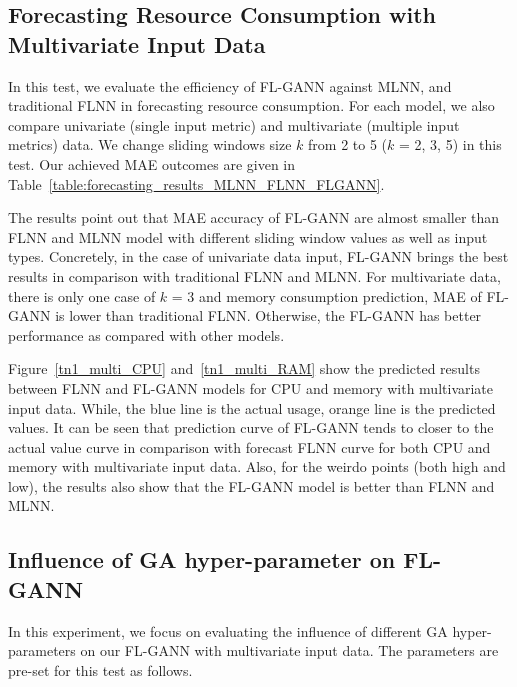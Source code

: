 \documentclass[conference]{IEEEtran}
\begin{document}
\subsection{Forecasting Resource Consumption with Multivariate Input Data}
\label{forecast}

In this test, we evaluate the efficiency of FL-GANN against MLNN, and traditional FLNN in forecasting resource consumption. For each model, we also compare univariate (single input metric) and multivariate (multiple input metrics) data. We change sliding windows size $k$ from 2 to 5 ($k$ = 2, 3, 5) in this test. Our achieved MAE outcomes are given in Table~\ref{table:forecasting_results_MLNN_FLNN_FLGANN}.

The results point out that MAE accuracy of FL-GANN are almost smaller than FLNN and MLNN model with different sliding window values as well as input types. Concretely, in the case of univariate data input, FL-GANN brings the best results in comparison with traditional FLNN and MLNN. For multivariate data, there is only one case of $k$ = 3 and memory consumption prediction, MAE of FL-GANN is lower than traditional FLNN. Otherwise, the FL-GANN has better performance as compared with other models.

Figure~\ref{tn1_multi_CPU} and~\ref{tn1_multi_RAM} show the predicted results between FLNN and FL-GANN models for CPU and memory with multivariate input data. While, the blue line is the actual usage, orange line is the predicted values. It can be seen that prediction curve of FL-GANN tends to closer to the actual value curve in comparison with forecast FLNN curve for both CPU and memory with multivariate input data. Also, for the weirdo points (both high and low), the results also show that the FL-GANN model is better than FLNN and MLNN.

\subsection{Influence of GA hyper-parameter on FL-GANN}
\label{influence1}
In this experiment, we focus on evaluating the influence of different GA hyper-parameters on our FL-GANN with multivariate input data. The parameters are pre-set for this test as follows.
\end{document}
